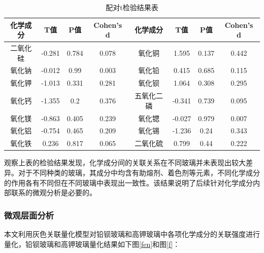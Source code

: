 \documentclass[withoutpreface,bwprint]{cumcmthesis} %
\begin{document}
\begin{table}[H]
  \centering
  \caption{配对t检验结果表}
  \begin{tabular}{cccccccc}
    \toprule[1.5pt]
    化学成分 & T值     & P值    & Cohen's d & 化学成分  & T值     & P值    & Cohen's d \\ \hline
    二氧化硅 & -0.281 & 0.784 & 0.078     & 氧化铜   & 1.595  & 0.137 & 0.442     \\
    氧化钠  & -0.012 & 0.99  & 0.003     & 氧化铅   & 0.415  & 0.685 & 0.115     \\
    氧化钾  & -1.013 & 0.331 & 0.281     & 氧化钡   & 1.064  & 0.308 & 0.295     \\
    氧化钙  & -1.355 & 0.2   & 0.376     & 五氧化二磷 & -0.341 & 0.739 & 0.095     \\
    氧化镁  & -0.863 & 0.405 & 0.239     & 氧化锶   & -0.027 & 0.979 & 0.007     \\
    氧化铝  & -0.754 & 0.465 & 0.209     & 氧化锡   & -1.236 & 0.24  & 0.343     \\
    氧化铁  & 0.236  & 0.817 & 0.065     & 二氧化硫  & 0.799  & 0.44  & 0.222     \\ \bottomrule[1.5pt]
  \end{tabular}
\end{table}

观察上表的检验结果发现，化学成分间的关联关系在不同玻璃并未表现出较大差异。对于不同种类的玻璃，其成分中均含有助熔剂、着色剂等元素，不同化学成分的作用各有不同但在不同玻璃中表现出一致性。该结果说明了后续针对化学成分内部联系的微观分析是必要的。

\subsubsection{微观层面分析}


本文利用灰色关联量化模型对铅钡玻璃和高钾玻璃中各项化学成分的关联强度进行量化，铅钡玻璃和高钾玻璃量化结果如下图\ref{fen}和图\ref{f}：
\end{document}
